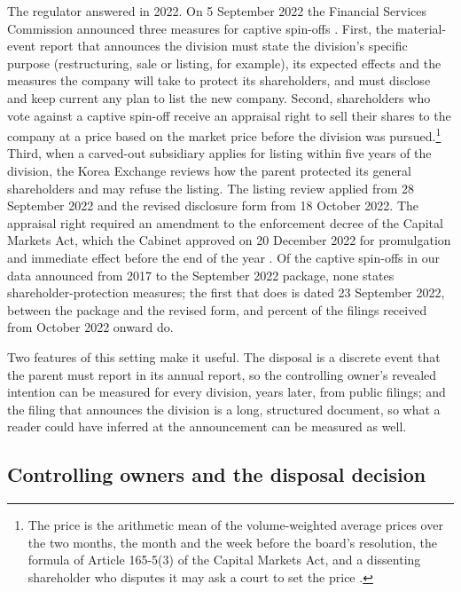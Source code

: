 The regulator answered in 2022. On 5 September 2022 the Financial Services Commission announced three measures for captive spin-offs \cite{fsc2022a}. First, the material-event report that announces the division must state the division's specific purpose (restructuring, sale or listing, for example), its expected effects and the measures the company will take to protect its shareholders, and must disclose and keep current any plan to list the new company. Second, shareholders who vote against a captive spin-off receive an appraisal right to sell their shares to the company at a price based on the market price before the division was pursued.\footnote{The price is the arithmetic mean of the volume-weighted average prices over the two months, the month and the week before the board's resolution, the formula of Article 165-5(3) of the Capital Markets Act, and a dissenting shareholder who disputes it may ask a court to set the price \cite{fsc2022a}.} Third, when a carved-out subsidiary applies for listing within five years of the division, the Korea Exchange reviews how the parent protected its general shareholders and may refuse the listing. The listing review applied from 28 September 2022 and the revised disclosure form from 18 October 2022. The appraisal right required an amendment to the enforcement decree of the Capital Markets Act, which the Cabinet approved on 20 December 2022 for promulgation and immediate effect before the end of the year \cite{fsc2022b}. Of the captive spin-offs in our data announced from 2017 to the September 2022 package, none states shareholder-protection measures; the first that does is dated 23 September 2022, between the package and the revised form, and \ProtectPost{} percent of the filings received from October 2022 onward do.

Two features of this setting make it useful. The disposal is a discrete event that the parent must report in its annual report, so the controlling owner's revealed intention can be measured for every division, years later, from public filings; and the filing that announces the division is a long, structured document, so what a reader could have inferred at the announcement can be measured as well.

\subsection{Controlling owners and the disposal decision}\label{sec:theory}

